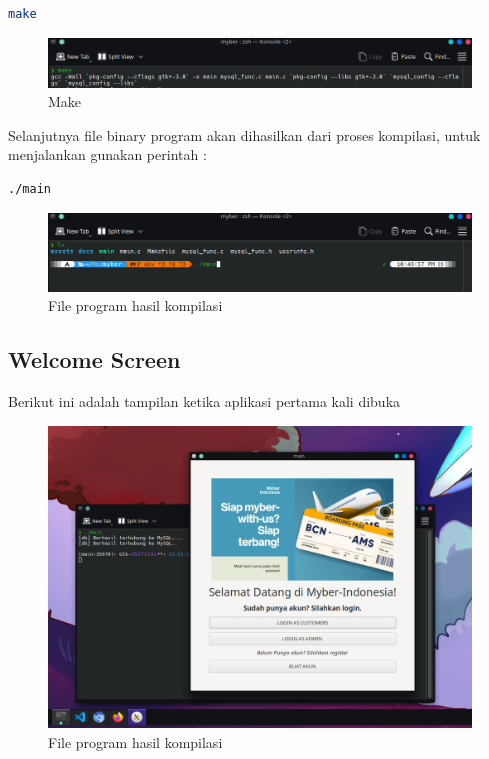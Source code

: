 \documentclass[a4paper,12pt]{article}
\begin{document}
\begin{lstlisting}[language=bash]
make
\end{lstlisting}

\begin{figure}[!htbp]
    \centering
    \includegraphics[width=1\textwidth]{./Make.png}
    \caption{Make}

\end{figure}
\FloatBarrier

Selanjutnya file binary program akan dihasilkan dari proses kompilasi, untuk menjalankan gunakan perintah :

\begin{lstlisting}[language=bash]
    ./main
\end{lstlisting}

\begin{figure}[!htbp]
    \centering
    \includegraphics[width=1\textwidth]{./Main.png}
    \caption{File program hasil kompilasi}

\end{figure}
\FloatBarrier 

\subsection{Welcome Screen}
Berikut ini adalah tampilan ketika aplikasi pertama kali dibuka

\begin{figure}[!htbp]
    \centering
    \includegraphics[width=1\textwidth]{./Welcome.png}
    \caption{File program hasil kompilasi}

\end{figure}
\FloatBarrier 
\end{document}
